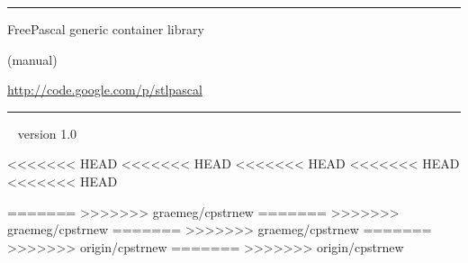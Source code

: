 \documentclass[a4paper]{report}
\begin{document}
\thispagestyle{empty}
\vfill
\vfill
\begin{center}
\begin{minipage}{0.8\textwidth}
\hrule
\bigskip\bigskip
\centerline{\LARGE\sc FreePascal generic container library}
\smallskip
\centerline{(manual)}
\smallskip
\centerline{\url{http://code.google.com/p/stlpascal}}
\bigskip
\bigskip
\bigskip\bigskip
\hrule
\end{minipage}
\end{center}
\vfill
{~}
\hfill version 1.0
\eject %

\tableofcontents










<<<<<<< HEAD
<<<<<<< HEAD
<<<<<<< HEAD
<<<<<<< HEAD
<<<<<<< HEAD


=======
>>>>>>> graemeg/cpstrnew
=======
>>>>>>> graemeg/cpstrnew
=======
>>>>>>> graemeg/cpstrnew
=======
>>>>>>> origin/cpstrnew
=======
>>>>>>> origin/cpstrnew
\end{document}
